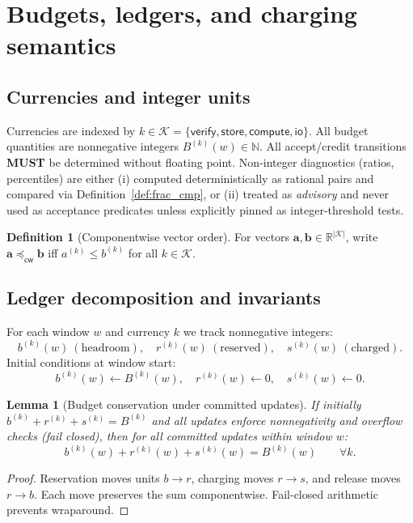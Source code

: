 \documentclass[11pt]{article}
\newcommand{\MUST}{\textbf{MUST}}
\newcommand{\R}{\mathbb{R}}
\newcommand{\N}{\mathbb{N}}
\newcommand{\1}{\mathbf{1}}
\newcommand{\cwise}{\preceq_{\textsf{cw}}}
\theoremstyle{definition}
\newtheorem{definition}{Definition}
\theoremstyle{plain}
\newtheorem{lemma}{Lemma}
\begin{document}
\section{Budgets, ledgers, and charging semantics}
\label{sec:budgets}

\subsection{Currencies and integer units}
Currencies are indexed by $k\in\mathcal{K}=\{\textsf{verify},\textsf{store},\textsf{compute},\textsf{io}\}$.
All budget quantities are nonnegative integers $B^{(k)}(w)\in \N$.
All accept/credit transitions \MUST{} be determined without floating point. Non-integer diagnostics (ratios, percentiles) are either (i) computed deterministically as rational pairs and compared via Definition~\ref{def:frac_cmp}, or (ii) treated as \emph{advisory} and never used as acceptance predicates unless explicitly pinned as integer-threshold tests.

\begin{definition}[Componentwise vector order]
For vectors $\mathbf{a},\mathbf{b}\in\R^{|\mathcal{K}|}$, write $\mathbf{a}\cwise \mathbf{b}$ iff $a^{(k)}\le b^{(k)}$ for all $k\in\mathcal{K}$.
\end{definition}

\subsection{Ledger decomposition and invariants}
For each window $w$ and currency $k$ we track nonnegative integers:
\[
b^{(k)}(w)\ (\text{headroom}),\quad
r^{(k)}(w)\ (\text{reserved}),\quad
s^{(k)}(w)\ (\text{charged}).
\]
Initial conditions at window start:
\[
b^{(k)}(w)\gets B^{(k)}(w),\quad r^{(k)}(w)\gets 0,\quad s^{(k)}(w)\gets 0.
\]

\begin{lemma}[Budget conservation under committed updates]
\label{lem:budget_conservation}
If initially $b^{(k)}+r^{(k)}+s^{(k)}=B^{(k)}$ and all updates enforce nonnegativity and overflow checks (fail closed), then for all committed updates within window $w$:
\[
b^{(k)}(w)+r^{(k)}(w)+s^{(k)}(w) = B^{(k)}(w)\qquad\forall k.
\]
\end{lemma}
\begin{proof}
Reservation moves units $b\rightarrow r$, charging moves $r\rightarrow s$, and release moves $r\rightarrow b$. Each move preserves the sum componentwise. Fail-closed arithmetic prevents wraparound.
\end{proof}
\end{document}
